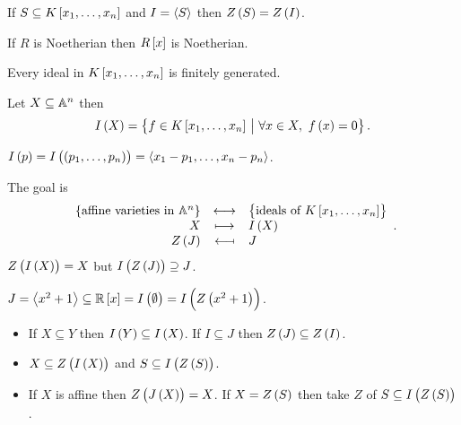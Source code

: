 \begin{remark}
If $ S \subseteq K\sbr{x_1, \dots, x_n} $ and $ I = \abr{S} $ then $ Z\br{S} = Z\br{I} $.
\end{remark}

\begin{theorem}
If $ R $ is Noetherian then $ R\sbr{x} $ is Noetherian.
\end{theorem}

\begin{corollary}
Every ideal in $ K\sbr{x_1, \dots, x_n} $ is finitely generated.
\end{corollary}

\begin{definition}
Let $ X \subseteq \AA^n $ then
$$ I\br{X} = \cbr{f \in K\sbr{x_1, \dots, x_n} \st \forall x \in X, \ f\br{x} = 0}. $$
\end{definition}

\begin{example}
$ I\br{p} = I\br{\br{p_1, \dots, p_n}} = \abr{x_1 - p_1, \dots, x_n - p_n} $.
\end{example}

The goal is
$$
\begin{array}{rcl}
\cbr{\text{affine varieties in} \ \AA^n} & \longleftrightarrow & \cbr{\text{ideals of} \ K\sbr{x_1, \dots, x_n}} \\
X & \longmapsto & I\br{X} \\
Z\br{J} & \longmapsfrom & J
\end{array}.
$$
$ Z\br{I\br{X}} = X $ but $ I\br{Z\br{J}} \supseteq J $.

\begin{example}
$ J = \abr{x^2 + 1} \subseteq \RR\sbr{x} = I\br{\emptyset} = I\br{Z\br{x^2 + 1}} $.
\end{example}

\begin{proposition}
\hfill
\begin{itemize}
\item If $ X \subseteq Y $ then $ I\br{Y} \subseteq I\br{X} $. If $ I \subseteq J $ then $ Z\br{J} \subseteq Z\br{I} $.
\item $ X \subseteq Z\br{I\br{X}} $ and $ S \subseteq I\br{Z\br{S}} $.
\item If $ X $ is affine then $ Z\br{J\br{X}} = X $. If $ X = Z\br{S} $ then take $ Z $ of $ S \subseteq I\br{Z\br{S}} $.
\end{itemize}
\end{proposition}

